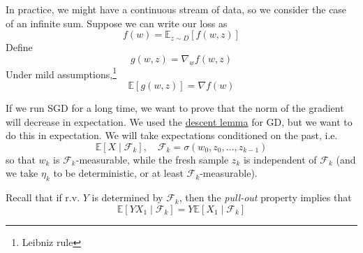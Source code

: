 	\begin{example}
	  \label{ex:stochastic-programming}
	  In practice, we might have a continuous stream of data, so we consider the case of an infinite sum. Suppose we can write our loss as 
		\begin{equation}
			f(w) = \mathbb{E}_{z \sim D} [f(w, z)]
		\end{equation}
		Define 
		\begin{equation}
		  g(w, z) = \nabla_w f(w, z)
		\end{equation}
		Under mild assumptions,\footnote{Leibniz rule}
		\begin{equation}
			\mathbb{E}[g(w, z)] = \nabla f(w) 
		\end{equation}
	\end{example}

	If we run SGD for a long time, we want to prove that the norm of the gradient will decrease in expectation. We used the \hyperref[thm:descent-lemma]{descent lemma} for GD, but we want to do this in expectation. We will take expectations conditioned on the past, i.e. 
	\begin{equation}
		\mathbb{E}[X \mid \mathcal{F}_k], \quad \mathcal{F}_k = \sigma(w_0, z_0, \ldots, z_{k-1})
	\end{equation}
	so that $w_k$ is $\mathcal{F}_k$-measurable, while the fresh sample $z_k$ is independent of $\mathcal{F}_k$ (and we take $\eta_k$ to be deterministic, or at least $\mathcal{F}_k$-measurable). 

	Recall that if r.v. $Y$ is determined by $\mathcal{F}_k$, then the \textit{pull-out} property implies that 
	\begin{equation}
		\mathbb{E}[Y X_1 \mid \mathcal{F}_k] = Y \mathbb{E}[X_1 \mid \mathcal{F}_k]
	\end{equation}

